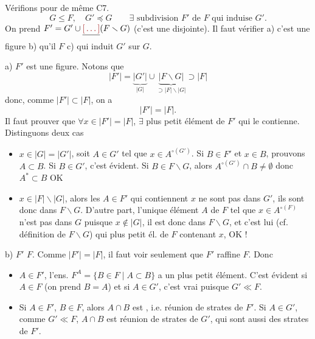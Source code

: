 \documentclass[11pt,a4paper]{article}
\begin{document}
Vérifions pour de même C7.
\[
  G \leq F, \quad G' \preccurlyeq G \qquad \exists \text{ subdivision } F' \text{ de } F \text{ qui induise } G'.
\]
On prend $F' = G' \cup \struck{\ill{}} (F \smallsetminus G)$ (c'est une  disjointe). Il faut vérifier a) c'est une figure b) qu'il   $F$ c) qui induit $G'$ sur $G$.


a) $F'$ est une figure.  Notons que 
\[
  |F'| = \underbrace{|G'|}_{|G|} \cup \underbrace{|F \smallsetminus G|}_{\supset |F| \smallsetminus |G|} \supset |F|
\]
donc, comme $|F'| \subset |F|$, on a
\[
  |F'| = |F| .
\]
Il faut prouver que $\forall x \in |F'| = |F|$, $\exists$ plus petit élément de $F'$ qui le contienne. Distinguons deux cas
\begin{itemize}
  \item[1°)] $x \in |G| = |G'|$, soit $A \in G'$ tel que $x \in A^{\circ(G')}$. Si $B \in F'$ et \struck{\ill{}} $x \in B$, prouvons $A \subset B$. Si $B \in G'$, c'est évident. Si $B \in F \smallsetminus G$, alors  $A^{\circ(G')} \cap B \neq \emptyset$ donc $A^{*} \subset B$ OK
  \item[2°)] $x \in |F| \smallsetminus |G|$, alors les $A \in F'$ qui contiennent $x$ ne sont pas dans $G'$, ils sont donc dans $F \smallsetminus G$. D'autre part, l'unique élément $A$ de $F$ tel que $x \in A^{\circ(F)}$ n'est pas dans $G$ puisque $x \notin |G|$, il est donc dans $F \smallsetminus G$, et  c'est lui (cf. définition de $F \smallsetminus G$) qui  plus petit él. de $F$ contenant $x$, OK !
\end{itemize}

b) $F'$   $F$. Comme $|F'| = |F|$, il faut voir \struck{\ill{}} seulement que $F'$ raffine $F$. Donc   
\begin{itemize}
  \item[1°)] \struck{$\forall$} $A \in F'$, l'ens. $F^{A} = \{B \in F \mid A \subset B\}$ a un plus petit élément. C'est évident si $A \in F$  (on prend $B = A$) et si $A \in G'$, c'est vrai puisque $G' \ll F$.
  \item[2°)] Si $A \in F'$, $B \in F$, alors $A \cap B$ est  , i.e. réunion de strates de $F'$. Si $A \in G'$, comme $G' \ll F$, $A \cap B$ est réunion de strates de $G'$, qui sont aussi des strates de $F'$.
\end{itemize}
\end{document}
